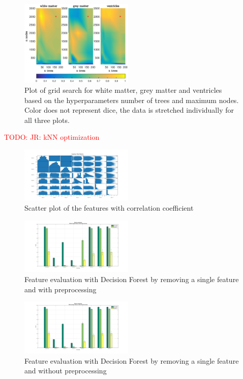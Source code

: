 \documentclass[journal]{IEEEtran}
\newcommand\TODO[1]{\textcolor{red}{TODO: #1}}
\begin{document}
\begin{figure}[h!]\label{f.df_white}
	\centering
	\includegraphics[width=0.48\textwidth]{images/df_grid}
	\caption{Plot of grid search for white matter, grey matter and ventricles based on the hyperparameters number of trees and maximum nodes. Color does not represent dice, the data is stretched individually for all three plots.}
\end{figure}

\TODO{JR: kNN optimization}

\begin{figure}\label{scatterplot}
	\centering
	\includegraphics[width=0.48\textwidth]{images/ScatterPlotMatrix}
	\caption{Scatter plot of the features with correlation coefficient}
\end{figure}

\begin{figure}\label{DF_FeatEval_WSF_PP}
	\centering
	\includegraphics[width=0.48\textwidth]{images/DF_FeatEval_WSF_PP}
	\caption{Feature evaluation with Decision Forest by removing a single feature and with preprocessing}
\end{figure}

\begin{figure}\label{DF_FeatEval_WSF_NPP}
	\centering
	\includegraphics[width=0.48\textwidth]{images/DF_FeatEval_WSF_NPP}
	\caption{Feature evaluation with Decision Forest by removing a single feature and without preprocessing}
\end{figure}
\end{document}
